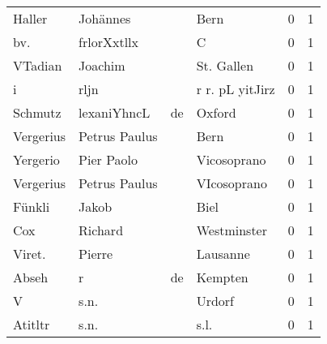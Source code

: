 \documentclass[10pt,a4paper,landscape]{article}
\begin{document}
\begin{longtable}{llllrr}
                   Haller &                           Johännes &             &                                        Bern &          0 &         1 \\
                      bv. &                        frlorXxtllx &             &                                           C &          0 &         1 \\
                  VTadian &                            Joachim &             &                                  St. Gallen &          0 &         1 \\
                        i &                               rljn &             &                             r r. pL yitJirz &          0 &         1 \\
                  Schmutz &                        lexaniYhncL &          de &                                      Oxford &          0 &         1 \\
                Vergerius &                      Petrus Paulus &             &                                        Bern &          0 &         1 \\
                 Yergerio &                         Pier Paolo &             &                                 Vicosoprano &          0 &         1 \\
                Vergerius &                      Petrus Paulus &             &                                 VIcosoprano &          0 &         1 \\
                   Fünkli &                              Jakob &             &                                        Biel &          0 &         1 \\
                      Cox &                            Richard &             &                                 Westminster &          0 &         1 \\
                   Viret. &                             Pierre &             &                                    Lausanne &          0 &         1 \\
                    Abseh &                                  r &          de &                                     Kempten &          0 &         1 \\
                        V &                               s.n. &             &                                      Urdorf &          0 &         1 \\
                  Atitltr &                               s.n. &             &                                        s.l. &          0 &         1 \\

\end{longtable}
\end{document}
